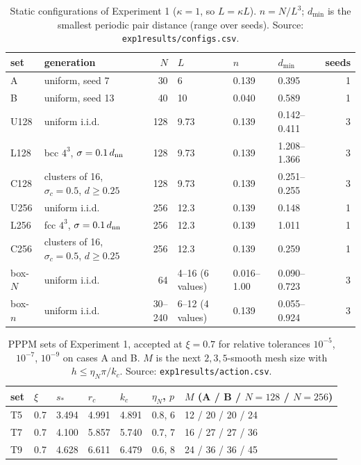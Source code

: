 \documentclass[11pt]{article}
\DeclareRobustCommand{\_}{\textunderscore\allowbreak}
\theoremstyle{remark}
\theoremstyle{definition}
\begin{document}
\begin{table}[htbp]
\centering\small
\caption{Static configurations of Experiment 1 ($\kappa=1$, so $L=\kappa L$). $n=N/L^3$; $d_{\min}$ is the smallest periodic pair
distance (range over seeds). Source: \texttt{exp1\_results/configs.csv}.}
\label{tab:exp1_configs}
\begin{tabular}{llrlllr}
\toprule
set & generation & $N$ & $L$ & $n$ & $d_{\min}$ & seeds \\
\midrule
A & uniform, seed 7 & 30 & 6 & 0.139 & 0.395 & 1 \\
B & uniform, seed 13 & 40 & 10 & 0.040 & 0.589 & 1 \\
U128 & uniform i.i.d. & 128 & 9.73 & 0.139 & 0.142--0.411 & 3 \\
L128 & bcc $4^3$, $\sigma=0.1\,d_{\rm nn}$ & 128 & 9.73 & 0.139 & 1.208--1.366 & 3 \\
C128 & clusters of 16, $\sigma_c=0.5$, $d\ge0.25$ & 128 & 9.73 & 0.139 & 0.251--0.255 & 3 \\
U256 & uniform i.i.d. & 256 & 12.3 & 0.139 & 0.148 & 1 \\
L256 & fcc $4^3$, $\sigma=0.1\,d_{\rm nn}$ & 256 & 12.3 & 0.139 & 1.011 & 1 \\
C256 & clusters of 16, $\sigma_c=0.5$, $d\ge0.25$ & 256 & 12.3 & 0.139 & 0.259 & 1 \\
box-$N$ & uniform i.i.d. & 64 & 4--16 (6 values) & 0.016--1.00 & 0.090--0.723 & 3 \\
box-$n$ & uniform i.i.d. & 30--240 & 6--12 (4 values) & 0.139 & 0.055--0.924 & 3 \\
\bottomrule
\end{tabular}
\end{table}

\begin{table}[htbp]
\centering\small
\caption{PPPM sets of Experiment 1, accepted at $\xi=0.7$ for relative tolerances $10^{-5}$, $10^{-7}$, $10^{-9}$ on cases A and B.
$M$ is the next $2,3,5$-smooth mesh size with $h\le\eta_N\pi/k_c$. Source: \texttt{exp1\_results/action.csv}.}
\label{tab:exp1_params}
\begin{tabular}{lllllll}
\toprule
set & $\xi$ & $s_\ast$ & $r_c$ & $k_c$ & $\eta_N$, $p$ & $M$ (A / B / $N\!=\!128$ / $N\!=\!256$) \\
\midrule
T5 & 0.7 & 3.494 & 4.991 & 4.891 & 0.8, 6 & 12 / 20 / 20 / 24 \\
T7 & 0.7 & 4.100 & 5.857 & 5.740 & 0.7, 7 & 16 / 27 / 27 / 36 \\
T9 & 0.7 & 4.628 & 6.611 & 6.479 & 0.6, 8 & 24 / 36 / 36 / 45 \\
\bottomrule
\end{tabular}
\end{table}
\end{document}
